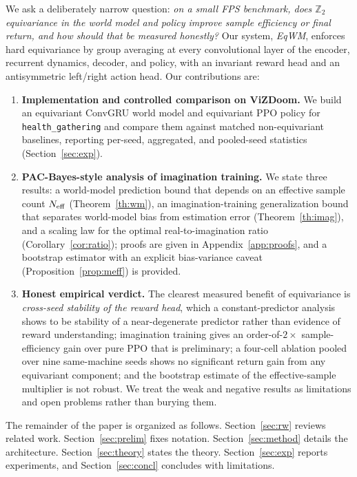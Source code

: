 \documentclass[sigconf,anonymous]{acmart}
\begin{document}
We ask a deliberately narrow question: \emph{on a small FPS benchmark, does
$\mathbb Z_2$ equivariance in the world model and policy improve sample
efficiency or final return, and how should that be measured honestly?} Our
system, \emph{EqWM}, enforces hard equivariance by group averaging
\cite{gcnn2016} at every convolutional layer of the encoder, recurrent
dynamics, decoder, and policy, with an invariant reward head and an
antisymmetric left/right action head. Our contributions are:
\begin{enumerate}[leftmargin=*]
  \item \textbf{Implementation and controlled comparison on ViZDoom.} We
        build an equivariant ConvGRU world model and equivariant PPO policy
        for \texttt{health\_gathering} and compare them against matched
        non-equivariant baselines, reporting per-seed, aggregated, and
        pooled-seed statistics (Section~\ref{sec:exp}).
  \item \textbf{PAC-Bayes-style analysis of imagination training.} We state
        three results: a world-model prediction bound that depends on an
        effective sample count $N_{\rm eff}$ (Theorem~\ref{th:wm}), an
        imagination-training generalization bound that separates world-model
        bias from estimation error (Theorem~\ref{th:imag}), and a scaling law
        for the optimal real-to-imagination ratio
        (Corollary~\ref{cor:ratio}); proofs are given in
        Appendix~\ref{app:proofs}, and a bootstrap estimator with an explicit
        bias-variance caveat (Proposition~\ref{prop:meff}) is provided.
  \item \textbf{Honest empirical verdict.} The clearest measured benefit of
        equivariance is \emph{cross-seed stability of the reward head}, which
        a constant-predictor analysis shows to be stability of a
        near-degenerate predictor rather than evidence of reward
        understanding; imagination training gives an order-of-$2\times$
        sample-efficiency gain over pure PPO that is preliminary; a four-cell
        ablation pooled over nine same-machine seeds shows no significant
        return gain from any equivariant component; and the bootstrap estimate
        of the effective-sample multiplier is not robust. We treat the weak
        and negative results as limitations and open problems rather than
        burying them.
\end{enumerate}

The remainder of the paper is organized as follows. Section~\ref{sec:rw}
reviews related work. Section~\ref{sec:prelim} fixes notation.
Section~\ref{sec:method} details the architecture. Section~\ref{sec:theory}
states the theory. Section~\ref{sec:exp} reports experiments, and
Section~\ref{sec:concl} concludes with limitations.
\end{document}
